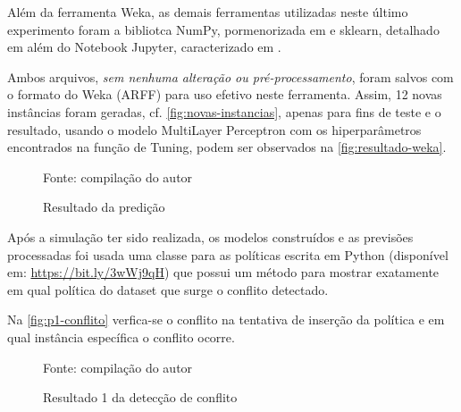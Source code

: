 Além da ferramenta Weka, as demais ferramentas utilizadas neste último experimento foram a bibliotca NumPy, pormenorizada em  e sklearn, detalhado em  além do Notebook Jupyter, caracterizado em . 

Ambos arquivos, \textit{sem nenhuma alteração ou pré-processamento}, foram salvos com o formato do Weka (ARFF) para uso efetivo neste ferramenta. Assim, 12 novas instâncias foram geradas, cf. \autoref{fig:novas-instancias}, apenas para fins de teste e o resultado, usando o modelo MultiLayer Perceptron com os hiperparâmetros encontrados na função de Tuning, podem ser observados na \autoref{fig:resultado-weka}.

\begin{figure}[h!]
	\centering
	\caption{Resultado da predição}
	
	\label{fig:resultado-weka}
	{\scriptsize Fonte: compilação do autor}
\end{figure}

Após a simulação ter sido realizada, os modelos construídos e as previsões processadas foi usada uma classe para as políticas escrita em Python (disponível em: \url{https://bit.ly/3wWj9qH}) que possui um método para mostrar exatamente em qual política do dataset que surge o conflito detectado. 

Na \autoref{fig:p1-conflito} verfica-se o conflito na tentativa de inserção da política e em qual instância específica o conflito ocorre.

\begin{figure}[H]
	\centering
	\caption{Resultado 1 da detecção de conflito}
	
	\label{fig:p1-conflito}
	{\scriptsize Fonte: compilação do autor}
\end{figure} 

